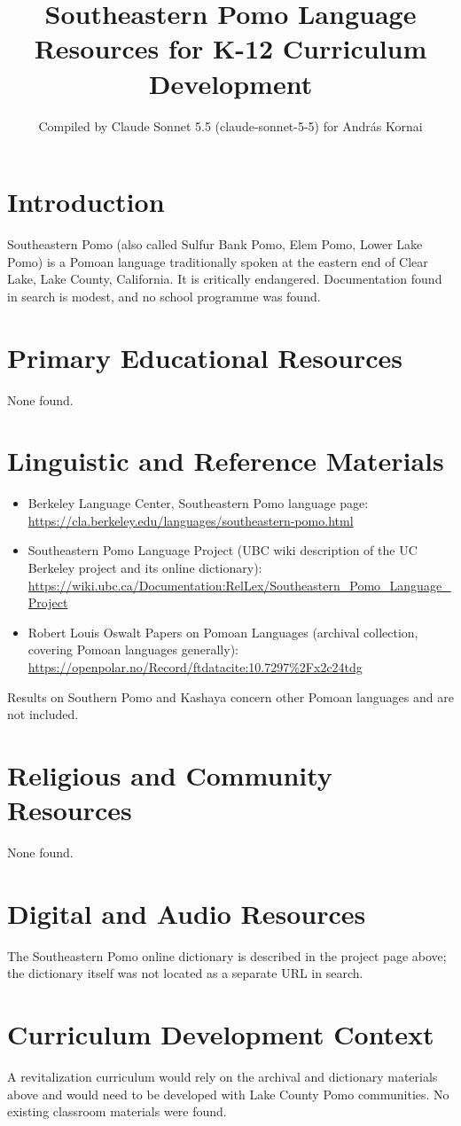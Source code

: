 \documentclass[12pt]{article}
\title{Southeastern Pomo Language Resources for K-12 Curriculum Development}
\author{Compiled by Claude Sonnet 5.5 (claude-sonnet-5-5) for Andr\'as Kornai}
\date{}
\begin{document}
\maketitle

\section{Introduction}
Southeastern Pomo (also called Sulfur Bank Pomo, Elem Pomo, Lower Lake Pomo) is a Pomoan language traditionally spoken at the eastern end of Clear Lake, Lake County, California. It is critically endangered. Documentation found in search is modest, and no school programme was found.

\section{Primary Educational Resources}
None found.

\section{Linguistic and Reference Materials}
\begin{itemize}
\item Berkeley Language Center, Southeastern Pomo language page: \url{https://cla.berkeley.edu/languages/southeastern-pomo.html}
\item Southeastern Pomo Language Project (UBC wiki description of the UC Berkeley project and its online dictionary): \url{https://wiki.ubc.ca/Documentation:RelLex/Southeastern_Pomo_Language_Project}
\item Robert Louis Oswalt Papers on Pomoan Languages (archival collection, covering Pomoan languages generally): \url{https://openpolar.no/Record/ftdatacite:10.7297%2Fx2c24tdg}
\end{itemize}
Results on Southern Pomo and Kashaya concern other Pomoan languages and are not included.

\section{Religious and Community Resources}
None found.

\section{Digital and Audio Resources}
The Southeastern Pomo online dictionary is described in the project page above; the dictionary itself was not located as a separate URL in search.

\section{Curriculum Development Context}
A revitalization curriculum would rely on the archival and dictionary materials above and would need to be developed with Lake County Pomo communities. No existing classroom materials were found.
\end{document}
